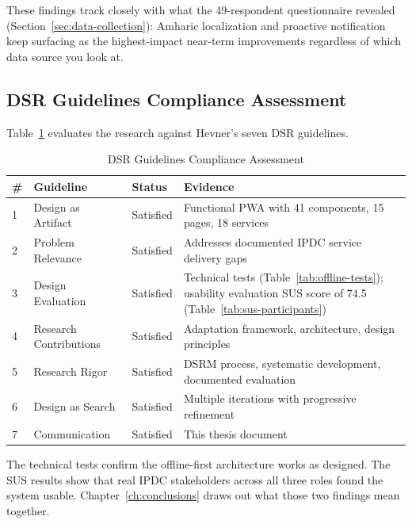 These findings track closely with what the 49-respondent questionnaire revealed (Section~\ref{sec:data-collection}): Amharic localization and proactive notification keep surfacing as the highest-impact near-term improvements regardless of which data source you look at.

\subsection{DSR Guidelines Compliance Assessment}

Table~\ref{tab:dsr-compliance} evaluates the research against Hevner's seven DSR guidelines.

\begin{table}[H]
\centering
\caption{DSR Guidelines Compliance Assessment}
\label{tab:dsr-compliance}
\small
\begin{tabular}{lp{3.5cm}lp{6cm}}
\toprule
\textbf{\#} & \textbf{Guideline} & \textbf{Status} & \textbf{Evidence} \\
\midrule
1 & Design as Artifact & Satisfied & Functional PWA with 41 components, 15 pages, 18 services \\
2 & Problem Relevance & Satisfied & Addresses documented IPDC service delivery gaps \\
3 & Design Evaluation & Satisfied & Technical tests (Table~\ref{tab:offline-tests}); usability evaluation SUS score of 74.5 (Table~\ref{tab:sus-participants}) \\
4 & Research Contributions & Satisfied & Adaptation framework, architecture, design principles \\
5 & Research Rigor & Satisfied & DSRM process, systematic development, documented evaluation \\
6 & Design as Search & Satisfied & Multiple iterations with progressive refinement \\
7 & Communication & Satisfied & This thesis document \\
\bottomrule
\end{tabular}
\end{table}

The technical tests confirm the offline-first architecture works as designed. The SUS results show that real IPDC stakeholders across all three roles found the system usable. Chapter~\ref{ch:conclusions} draws out what those two findings mean together.

